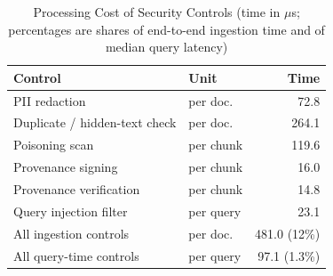 \begin{table}[!htbp]
\centering
\caption{Processing Cost of Security Controls (time in $\mu$s; percentages are shares of end-to-end ingestion time and of median query latency)}
\label{tab:secoverhead}
\footnotesize
\begin{tabular*}{\columnwidth}{@{\extracolsep{\fill}}llr@{}}
\toprule
Control & Unit & Time \\
\midrule
PII redaction & per doc. & 72.8 \\
Duplicate / hidden-text check & per doc. & 264.1 \\
Poisoning scan & per chunk & 119.6 \\
Provenance signing & per chunk & 16.0 \\
Provenance verification & per chunk & 14.8 \\
Query injection filter & per query & 23.1 \\
\midrule
All ingestion controls & per doc. & 481.0 (12\%) \\
All query-time controls & per query & 97.1 (1.3\%) \\
\bottomrule
\end{tabular*}
\end{table}
